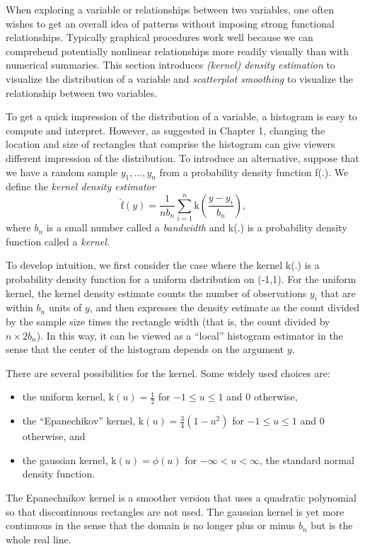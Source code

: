 When exploring a variable or relationships between two variables,
one often wishes to get an overall idea of patterns without imposing
strong functional relationships. Typically graphical procedures work
well because we can comprehend potentially nonlinear relationships
more readily visually than with numerical summaries. This section
introduces \emph{(kernel) density estimation} to visualize the
distribution of a variable and \emph{scatterplot smoothing} to
visualize the relationship between two variables.

To get a quick impression of the distribution of a variable, a
histogram is easy to compute and interpret. However, as suggested in
Chapter 1, changing the location and size of rectangles that
comprise the histogram can give viewers different impression of the
distribution. To introduce an alternative, suppose that we have a
random sample $y_1, \ldots, y_n$ from a probability density function
f(.). We define the \emph{kernel density estimator}
\begin{equation*}
\hat{\mathrm{f}}(y) = \frac{1}{n b_n} \sum_{i=1}^n
\mathrm{k}\left(\frac{y-y_i}{b_n}\right),
\end{equation*}
where $b_n$ is a small number called a \emph{bandwidth} and k(.) is
a probability density function called a \emph{kernel}.

To develop intuition, we first consider the case where the kernel
k(.) is a probability density function for a uniform distribution on
(-1,1). For the uniform kernel, the kernel density estimate counts
the number of observations $y_i$ that are within $b_n$ units of $y$,
and then expresses the density estimate as the count divided by the
sample size times the rectangle width (that is, the count divided by
$n \times 2 b_n$). In this way, it can be viewed as a ``local''
histogram estimator in the sense that the center of the histogram
depends on the argument $y$.

There are several possibilities for the kernel. Some widely used
choices are:
\begin{itemize}
\item the uniform kernel, $\mathrm{k}(u) = \frac{1}{2}$ for $-1 \leq u
\leq 1$ and 0 otherwise,
\item the ``Epanechikov'' kernel, $\mathrm{k}(u) = \frac{3}{4}(1-u^2)$ for $-1 \leq u
\leq 1$ and 0 otherwise, and

\item the gaussian kernel, $\mathrm{k}(u) = \phi(u)$ for $-\infty <
u < \infty$, the standard normal density function.
\end{itemize}
The Epanechnikov kernel is a smoother version that uses a quadratic
polynomial so that discontinuous rectangles are not used. The
gaussian kernel is yet more continuous in the sense that the domain
is no longer plus or minus $b_n$ but is the whole real line.



